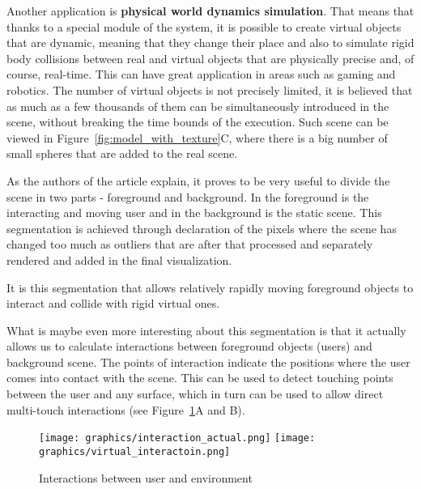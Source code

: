 \documentclass[11pt, a4paper]{article}
\theoremstyle{plain}
\begin{document}
  Another application is \textbf{physical world dynamics simulation}. That means
  that thanks to a special module of the system, it is possible to create
  virtual objects that are dynamic, meaning that they change their place and
  also to simulate rigid body collisions between real and virtual objects that
  are physically precise and, of course, real-time. This can have great
  application in areas such as gaming and robotics. The number of virtual
  objects is not precisely limited, it is believed that as much as a few
  thousands of them can be simultaneously introduced in the scene, without
  breaking the time bounds of the execution. Such scene can be viewed in
  Figure~\ref{fig:model_with_texture}C, where there is a big number of small
  spheres that are added to the real scene.

  As the authors of the article explain, it proves to be very useful to divide
  the scene in two parts - foreground and background. In the foreground is the
  interacting and moving user and in the background is the static scene. This
  segmentation is achieved through declaration of the pixels where the scene has
  changed too much as outliers that are after that processed and separately
  rendered and added in the final visualization. 

  It is this segmentation that allows relatively rapidly moving foreground
  objects to interact and collide with rigid virtual ones. 

  What is maybe even more interesting about this segmentation is that it
  actually allows us to calculate interactions between foreground objects
  (users) and background scene. The points of interaction indicate the positions
  where the user comes into contact with the scene. This can be used to detect
  touching points between the user and any surface, which in turn can be used to
  allow direct multi-touch interactions (see Figure~\ref{fig:interactions}A and
  B).

  \begin{figure}
    \centering
    \texttt{[image: graphics/interaction\_actual.png]}
    \texttt{[image: graphics/virtual\_interactoin.png]}
    \caption{Interactions between user and environment}
    \label{fig:interactions}
  \end{figure}
\end{document}
